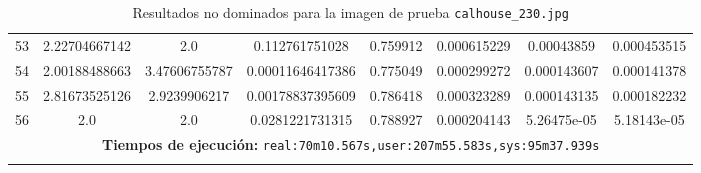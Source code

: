 \begin{longtable}{|c|c|c|c|c|c|c|c|}
53 & 2.22704667142 & 2.0 & 0.112761751028 & 0.759912 & 0.000615229 & 0.00043859 & 0.000453515 \\
54 & 2.00188488663 & 3.47606755787 & 0.00011646417386 & 0.775049 & 0.000299272 & 0.000143607 & 0.000141378 \\
55 & 2.81673525126 & 2.9239906217 & 0.00178837395609 & 0.786418 & 0.000323289 & 0.000143135 & 0.000182232 \\
56 & 2.0 & 2.0 & 0.0281221731315 & 0.788927 & 0.000204143 & 5.26475e-05 & 5.18143e-05 \\
 \hline
\multicolumn{8}{|c|}{\textbf{Tiempos de ejecución:} \texttt{real:70m10.567s,user:207m55.583s,sys:95m37.939s}}\\  \hline
\caption{Resultados no dominados para la imagen de prueba \texttt{calhouse\_230.jpg}}
\label{tab:calhouse_230}
\end{longtable}
\normalsize

